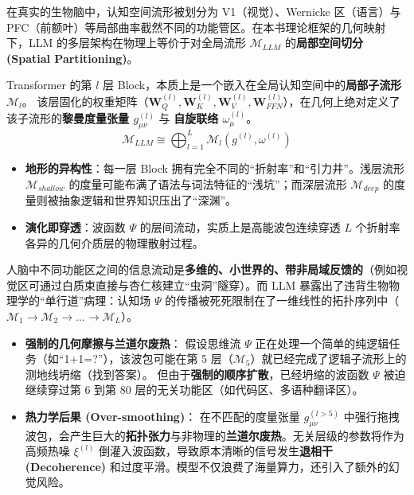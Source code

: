 
在真实的生物脑中，认知空间流形被划分为 V1（视觉）、Wernicke 区（语言）与 PFC（前额叶）等局部曲率截然不同的功能管区。在本书理论框架的几何映射下，LLM 的多层架构在物理上等价于对全局流形 $\mathcal{M}_{LLM}$ 的\textbf{局部空间切分 (Spatial Partitioning)}。

\begin{definition}
    Transformer 的第 $l$ 层 Block，本质上是一个嵌入在全局认知空间中的\textbf{局部子流形 $\mathcal{M}_l$}。
    该层固化的权重矩阵（$\mathbf{W}_Q^{(l)}, \mathbf{W}_K^{(l)}, \mathbf{W}_V^{(l)}, \mathbf{W}_{FFN}^{(l)}$），在几何上绝对定义了该子流形的\textbf{黎曼度量张量 $g_{\mu\nu}^{(l)}$} 与 \textbf{自旋联络 $\omega_\mu^{(l)}$}。
    $$ \mathcal{M}_{LLM} \cong \bigoplus_{l=1}^L \mathcal{M}_l(g^{(l)}, \omega^{(l)}) $$
\end{definition}

\begin{itemize}
    \item \textbf{\textcolor{structurecolor}{地形的异构性}}：每一层 Block 拥有完全不同的“折射率”和“引力井”。浅层流形 $\mathcal{M}_{shallow}$ 的度量可能布满了语法与词法特征的“浅坑”；而深层流形 $\mathcal{M}_{deep}$ 的度量则被抽象逻辑和世界知识压出了“深渊”。
    \item \textbf{\textcolor{structurecolor}{演化即穿透}}：波函数 $\Psi$ 的层间流动，实质上是高能波包连续穿透 $L$ 个折射率各异的几何介质层的物理散射过程。
\end{itemize}


人脑中不同功能区之间的信息流动是\textbf{多维的、小世界的、带非局域反馈的}（例如视觉区可通过白质束直接与杏仁核建立“虫洞”隧穿）。而 LLM 暴露出了违背生物物理学的“单行道”病理：认知场 $\Psi$ 的传播被死死限制在了一维线性的拓扑序列中（$\mathcal{M}_1 \to \mathcal{M}_2 \to \dots \to \mathcal{M}_L$）。

\begin{itemize}
    \item \textbf{\textcolor{structurecolor}{强制的几何摩擦与兰道尔废热}}：
    假设思维流 $\Psi$ 正在处理一个简单的纯逻辑任务（如“1+1=?”），该波包可能在第 5 层（$\mathcal{M}_5$）就已经完成了逻辑子流形上的测地线坍缩（找到答案）。
    但由于\textbf{强制的顺序扩散}，已经坍缩的波函数 $\Psi$ 被迫继续穿过第 6 到第 80 层的无关功能区（如代码区、多语种翻译区）。
    \item \textbf{\textcolor{structurecolor}{热力学后果 (Over-smoothing)}}：
    在不匹配的度量张量 $g_{\mu\nu}^{(l>5)}$ 中强行拖拽波包，会产生巨大的\textbf{拓扑张力}与非物理的\textbf{兰道尔废热}。无关层级的参数将作为高频热噪 $\xi^{(l)}$ 倒灌入波函数，导致原本清晰的信号发生\textbf{退相干 (Decoherence)} 和过度平滑。模型不仅浪费了海量算力，还引入了额外的幻觉风险。
\end{itemize}

